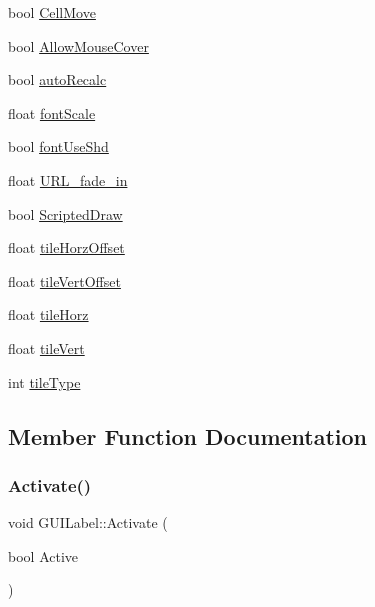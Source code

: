 \begin{DoxyCompactItemize}
bool \hyperlink{class_g_u_i_label_ab35df157c6f170b7e88498d225e99664}{Cell\+Move}
\item 
bool \hyperlink{class_g_u_i_label_ae89bb242fbe17884b80ad86e725532e4}{Allow\+Mouse\+Cover}
\item 
bool \hyperlink{class_g_u_i_label_a3759d071e30a88887e0a0e059fcbddd5}{auto\+Recalc}
\item 
float \hyperlink{class_g_u_i_label_a524a4cdbca46ebf797debfdfbd229a58}{font\+Scale}
\item 
bool \hyperlink{class_g_u_i_label_acac3e908bd305acab560dabd4e9559e8}{font\+Use\+Shd}
\item 
float \hyperlink{class_g_u_i_label_a7e65c2f0b7294842caea411578422fd2}{U\+R\+L\+\_\+fade\+\_\+in}
\item 
bool \hyperlink{class_g_u_i_label_a2dc83600c1a8d1803908b6e1635d1045}{Scripted\+Draw}
\item 
float \hyperlink{class_g_u_i_label_ae412093e6754d7952126b8003811efc0}{tile\+Horz\+Offset}
\item 
float \hyperlink{class_g_u_i_label_ab63b45e062812ca5aa7a77406b8599b2}{tile\+Vert\+Offset}
\item 
float \hyperlink{class_g_u_i_label_aefa1b081c1005fe93c8c2718be886d2f}{tile\+Horz}
\item 
float \hyperlink{class_g_u_i_label_aecb91fd9aa8748bfa71d168efd81960c}{tile\+Vert}
\item 
int \hyperlink{class_g_u_i_label_a953d84b5fc97168638b2272b258c5070}{tile\+Type}
\end{DoxyCompactItemize}


\subsection{Member Function Documentation}
\hypertarget{class_g_u_i_label_a03e5eebc66c5e662535f92cc3778b5aa}{}\label{class_g_u_i_label_a03e5eebc66c5e662535f92cc3778b5aa} 
\subsubsection{\texorpdfstring{Activate()}{Activate()}}
{\footnotesize\ttfamily void G\+U\+I\+Label\+::\+Activate (\begin{DoxyParamCaption}\item[{bool}]{Active }\end{DoxyParamCaption})}

